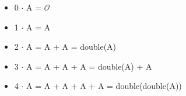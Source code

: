 \begin{itemize}
    \item[] 0 $\cdot$ A = $\mathcal{O}$
    \item[] 1 $\cdot$ A = A
    \item[] 2 $\cdot$ A = A + A = double(A)
    \item[] 3 $\cdot$ A = A + A + A = double(A) + A
    \item[] 4 $\cdot$ A = A + A + A + A = double(double(A))
\end{itemize}


